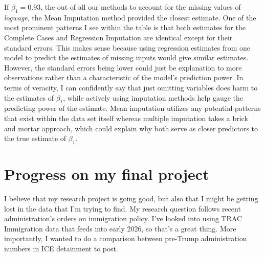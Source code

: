 \documentclass{article}
\begin{document}
If $\beta_1= 0.93$, the out of all our methods to account for the missing values of \textit{logwage}, the Mean Imputation method provided the closest estimate. One of the most prominent patterns I see within the table is that both estimates for the Complete Cases and Regression Imputation are identical except for their standard errors. This makes sense because using regression estimates from one model to predict the estimates of missing inputs would give similar estimates. However, the standard errors being lower could just be explanation to more observations rather than a characteristic of the model's prediction power. In terms of veracity, I can confidently say that just omitting variables does harm to the estimates of $\beta_1$, while actively using imputation methods help gauge the predicting power of the estimate. Mean imputation utilizes any potential patterns that exist within the data set itself whereas multiple imputation takes a brick and mortar approach, which could explain why both serve as closer predictors to the true estimate of $\beta_1$. 

\section{Progress on my final project}

I believe that my research project is going good, but also that I might be getting lost in the data that I'm trying to find. My research question follows recent administration's orders on immigration policy. I've looked into using TRAC Immigration data that feeds into early 2026, so that's a great thing. More importantly, I wanted to do a comparison between pre-Trump administration numbers in ICE detainment to post. 
\end{document}
